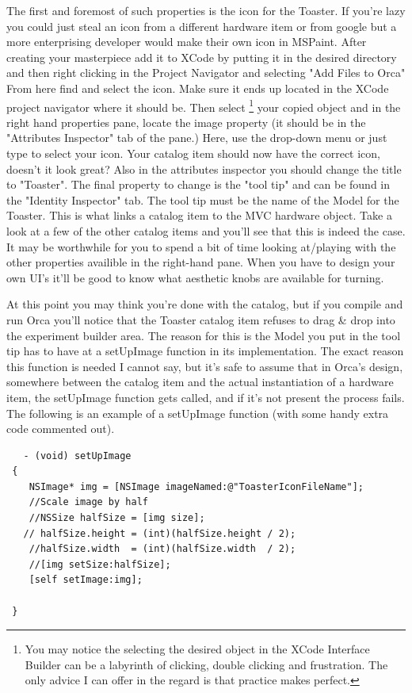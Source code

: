 \documentclass[12pt,a4paper]{article}
\begin{document}
The first and foremost of such properties is the icon for the Toaster.
  If you're lazy you could just steal an icon from a different hardware item or from google but a more enterprising developer would make their own icon in MSPaint. 
  After creating your masterpiece add it to XCode by putting it in the desired directory and then right clicking in the Project Navigator and selecting "Add Files to Orca"
  From here find and select the icon.
  Make sure it ends up located in the XCode project navigator where it should be.
  Then select
  \footnote{You may notice the selecting the desired object in the XCode Interface Builder can be a labyrinth of clicking, double clicking and frustration.  
The only advice I can offer in the regard is that practice makes perfect.}
   your copied object and in the right hand properties pane, locate the image property 
   (it should be in the "Attributes Inspector" tab of the pane.)
   Here, use the drop-down menu or just type to select your icon.
   Your catalog item should now have the correct icon, doesn't it look great?
   Also in the attributes inspector you should change the title to "Toaster".
   The final property to change is the "tool tip" and can be found in the "Identity Inspector" tab.
   The tool tip must be the name of the Model for the Toaster. 
   This is what links a catalog item to the MVC hardware object.
   Take a look at a few of the other catalog items and you'll see that this is indeed the case.
  It may be worthwhile for you to spend a bit of time looking at/playing with the other properties availible in the right-hand pane.
  When you have to design your own UI's it'll be good to know what aesthetic knobs are available for turning.
   
   At this point you may think you're done with the catalog, but if you compile and run Orca you'll notice that the Toaster catalog item refuses to drag \& drop into the experiment builder area.
    The reason for this is the Model you put in the tool tip has to have at a setUpImage function in its implementation.
     The exact reason this function is needed I cannot say, but it's safe to assume that in Orca's design, somewhere between the catalog item and the actual instantiation of a hardware item, the setUpImage function gets called,
 and if it's not present the process fails.
The following is an example of a  setUpImage function (with some handy extra code commented out).

\begin{lstlisting}
   - (void) setUpImage
 {
    NSImage* img = [NSImage imageNamed:@"ToasterIconFileName"];
    //Scale image by half    
    //NSSize halfSize = [img size];
   // halfSize.height = (int)(halfSize.height / 2);
    //halfSize.width  = (int)(halfSize.width  / 2);
    //[img setSize:halfSize];
    [self setImage:img];

 }
\end{lstlisting}
\end{document}
